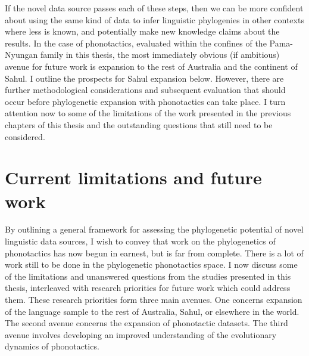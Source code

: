 If the novel data source passes each of these steps, then we can be more confident about using the same kind of data to infer linguistic phylogenies in other contexts where less is known, and potentially make new knowledge claims about the results. In the case of phonotactics, evaluated within the confines of the Pama-Nyungan family in this thesis, the most immediately obvious (if ambitious) avenue for future work is expansion to the rest of Australia and the continent of Sahul. I outline the prospects for Sahul expansion below. However, there are further methodological considerations and subsequent evaluation that should occur before phylogenetic expansion with phonotactics can take place. I turn attention now to some of the limitations of the work presented in the previous chapters of this thesis and the outstanding questions that still need to be considered.

\hypertarget{current-limitations-and-future-work}{%
\section{Current limitations and future work}\label{current-limitations-and-future-work}}

By outlining a general framework for assessing the phylogenetic potential of novel linguistic data sources, I wish to convey that work on the phylogenetics of phonotactics has now begun in earnest, but is far from complete. There is a lot of work still to be done in the phylogenetic phonotactics space. I now discuss some of the limitations and unanswered questions from the studies presented in this thesis, interleaved with research priorities for future work which could address them. These research priorities form three main avenues. One concerns expansion of the language sample to the rest of Australia, Sahul, or elsewhere in the world. The second avenue concerns the expansion of phonotactic datasets. The third avenue involves developing an improved understanding of the evolutionary dynamics of phonotactics.

